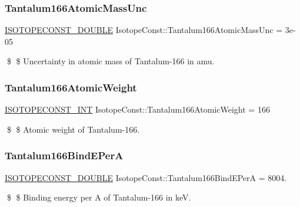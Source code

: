 \subsubsection{\texorpdfstring{Tantalum166\+Atomic\+Mass\+Unc}{Tantalum166AtomicMassUnc}}
{\footnotesize\ttfamily \mbox{\hyperlink{group___isotope_const-_macros_ga8f45a7272ce02c0b4c65c44636ed719a}{I\+S\+O\+T\+O\+P\+E\+C\+O\+N\+S\+T\+\_\+\+D\+O\+U\+B\+LE}} Isotope\+Const\+::\+Tantalum166\+Atomic\+Mass\+Unc = 3e-\/05}

\$ \$ Uncertainty in atomic mass of Tantalum-\/166 in amu. \mbox{\label{group___isotope_const-_tantalum-_ta166_ga430aa63165c42d64f75bbf48cd47f1e2}} 
\subsubsection{\texorpdfstring{Tantalum166\+Atomic\+Weight}{Tantalum166AtomicWeight}}
{\footnotesize\ttfamily \mbox{\hyperlink{group___isotope_const-_macros_ga5f18360b3e99483a35c32d789e62621c}{I\+S\+O\+T\+O\+P\+E\+C\+O\+N\+S\+T\+\_\+\+I\+NT}} Isotope\+Const\+::\+Tantalum166\+Atomic\+Weight = 166}

\$ \$ Atomic weight of Tantalum-\/166. \mbox{\label{group___isotope_const-_tantalum-_ta166_gad7b88b0d78c0e200b7203f70dbc88d91}} 
\subsubsection{\texorpdfstring{Tantalum166\+Bind\+E\+PerA}{Tantalum166BindEPerA}}
{\footnotesize\ttfamily \mbox{\hyperlink{group___isotope_const-_macros_ga8f45a7272ce02c0b4c65c44636ed719a}{I\+S\+O\+T\+O\+P\+E\+C\+O\+N\+S\+T\+\_\+\+D\+O\+U\+B\+LE}} Isotope\+Const\+::\+Tantalum166\+Bind\+E\+PerA = 8004.}

\$ \$ Binding energy per A of Tantalum-\/166 in keV. \mbox{\label{group___isotope_const-_tantalum-_ta166_ga0f2d03cdf7b7dee592542c0f47d97edc}} 
